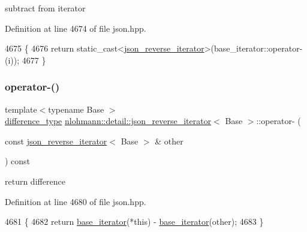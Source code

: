 subtract from iterator 



Definition at line 4674 of file json.\+hpp.


\begin{DoxyCode}
4675     \{
4676         \textcolor{keywordflow}{return} \textcolor{keyword}{static\_cast<}\hyperlink{classnlohmann_1_1detail_1_1json__reverse__iterator_a0246de16ece16293f2917dfa5d96e278}{json\_reverse\_iterator}\textcolor{keyword}{>}(base\_iterator::operator-(i));
4677     \}
\end{DoxyCode}
\mbox{\label{classnlohmann_1_1detail_1_1json__reverse__iterator_aaaa6c0b1d74e74e35e5f7b56dfd6c5d1}} 
\subsubsection{\texorpdfstring{operator-\/()}{operator-()}\hspace{0.1cm}{\footnotesize\ttfamily [2/2]}}
{\footnotesize\ttfamily template$<$typename Base $>$ \\
\hyperlink{classnlohmann_1_1detail_1_1json__reverse__iterator_a9ab55987c05ec6427ad36082e351cc45}{difference\+\_\+type} \hyperlink{classnlohmann_1_1detail_1_1json__reverse__iterator}{nlohmann\+::detail\+::json\+\_\+reverse\+\_\+iterator}$<$ Base $>$\+::operator-\/ (\begin{DoxyParamCaption}\item[{const \hyperlink{classnlohmann_1_1detail_1_1json__reverse__iterator}{json\+\_\+reverse\+\_\+iterator}$<$ Base $>$ \&}]{other }\end{DoxyParamCaption}) const\hspace{0.3cm}{\ttfamily [inline]}}



return difference 



Definition at line 4680 of file json.\+hpp.


\begin{DoxyCode}
4681     \{
4682         \textcolor{keywordflow}{return} \hyperlink{classnlohmann_1_1detail_1_1json__reverse__iterator_a6b2ef1d632fe49bfcc22fbd1abd62395}{base\_iterator}(*\textcolor{keyword}{this}) - \hyperlink{classnlohmann_1_1detail_1_1json__reverse__iterator_a6b2ef1d632fe49bfcc22fbd1abd62395}{base\_iterator}(other);
4683     \}
\end{DoxyCode}
\mbox{\label{classnlohmann_1_1detail_1_1json__reverse__iterator_a2c170f51371538da2c8f4094305da3d3}} 
